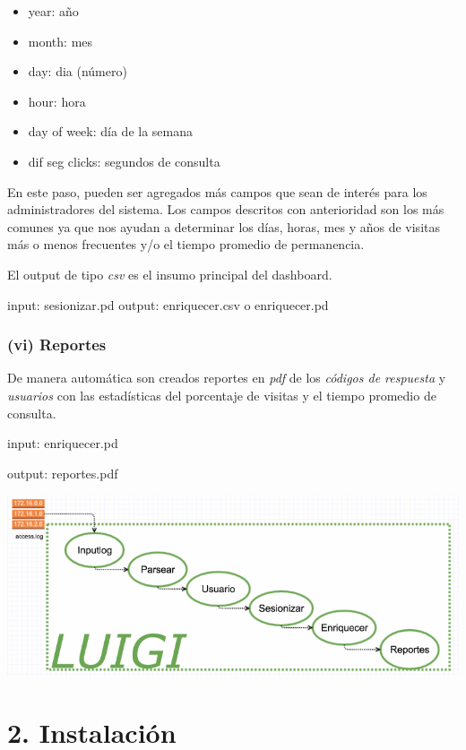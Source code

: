 \documentclass[]{article}
\begin{document}
\begin{itemize}
\itemsep1pt\parskip0pt
\item
  year: año
\item
  month: mes
\item
  day: dia (número)
\item
  hour: hora
\item
  day of week: día de la semana
\item
  dif seg clicks: segundos de consulta
\end{itemize}

En este paso, pueden ser agregados más campos que sean de interés para
los administradores del sistema. Los campos descritos con anterioridad
son los más comunes ya que nos ayudan a determinar los días, horas, mes
y años de visitas más o menos frecuentes y/o el tiempo promedio de
permanencia.

El output de tipo \emph{csv} es el insumo principal del dashboard.

input: sesionizar.pd output: enriquecer.csv o enriquecer.pd

\subsubsection{(vi) Reportes}\label{vi-reportes}

De manera automática son creados reportes en \emph{pdf} de los
\emph{códigos de respuesta} y \emph{usuarios} con las estadísticas del
porcentaje de visitas y el tiempo promedio de consulta.

input: enriquecer.pd

output: reportes.pdf

\begin{center}\includegraphics{entregable-analisis_clickstream_files/figure-latex/unnamed-chunk-1-1} \end{center}

\section{2. Instalación}\label{instalacion}
\end{document}
